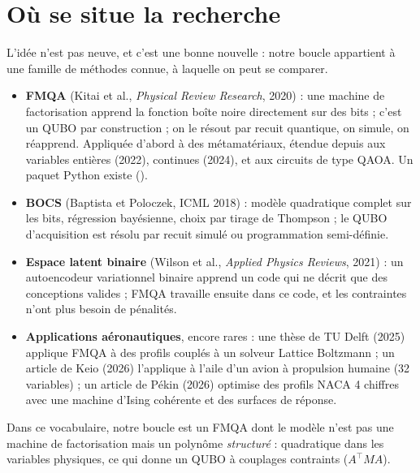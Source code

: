 \section{Où se situe la recherche}
L'idée n'est pas neuve, et c'est une bonne nouvelle : notre boucle appartient à une famille de méthodes connue, à laquelle on peut se comparer.
\begin{itemize}
\item \textbf{FMQA} (Kitai et al., \emph{Physical Review Research}, 2020) : une machine de factorisation apprend la fonction boîte noire directement sur des bits ; c'est un QUBO par construction ; on le résout par recuit quantique, on simule, on réapprend. Appliquée d'abord à des métamatériaux, étendue depuis aux variables entières (2022), continues (2024), et aux circuits de type QAOA. Un paquet Python existe ().
\item \textbf{BOCS} (Baptista et Poloczek, ICML 2018) : modèle quadratique complet sur les bits, régression bayésienne, choix par tirage de Thompson ; le QUBO d'acquisition est résolu par recuit simulé ou programmation semi-définie.
\item \textbf{Espace latent binaire} (Wilson et al., \emph{Applied Physics Reviews}, 2021) : un autoencodeur variationnel binaire apprend un code qui ne décrit que des conceptions valides ; FMQA travaille ensuite dans ce code, et les contraintes n'ont plus besoin de pénalités.
\item \textbf{Applications aéronautiques}, encore rares : une thèse de TU Delft (2025) applique FMQA à des profils couplés à un solveur Lattice Boltzmann ; un article de Keio (2026) l'applique à l'aile d'un avion à propulsion humaine (32 variables) ; un article de Pékin (2026) optimise des profils NACA 4 chiffres avec une machine d'Ising cohérente et des surfaces de réponse.
\end{itemize}
Dans ce vocabulaire, notre boucle est un FMQA dont le modèle n'est pas une machine de factorisation mais un polynôme \emph{structuré} : quadratique dans les variables physiques, ce qui donne un QUBO à couplages contraints ($A^\top MA$).

